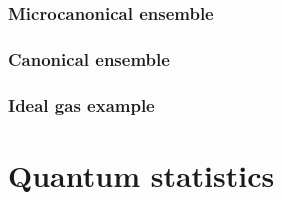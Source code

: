 \documentclass[letter-paper]{tufte-book}
\begin{document}

\subsection{Microcanonical ensemble}


\subsection{Canonical ensemble}


\subsection{Ideal gas example}


\chapter{Quantum statistics}










\mainmatter




%


\end{document}
